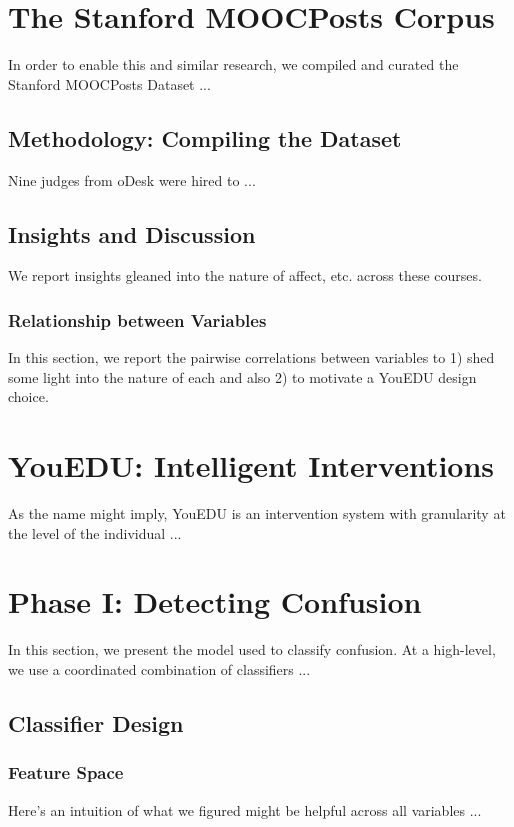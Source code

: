 \documentclass{edm_template}
\begin{document}
\section{The Stanford MOOCPosts Corpus}
In order to enable this and similar research, we compiled and curated the Stanford MOOCPosts Dataset ...

\subsection{Methodology: Compiling the Dataset}
Nine judges from oDesk were hired to ...

\subsection{Insights and Discussion}
We report insights gleaned into the nature of affect, etc. across these courses.

\subsubsection{Relationship between Variables}
In this section, we report the pairwise correlations between variables to 1) shed some light into the nature of each and also 2) to motivate a YouEDU design choice.

\section{YouEDU: Intelligent Interventions}
As the name might imply, YouEDU is an intervention system with granularity at the level of the individual ...

\section{Phase I: Detecting Confusion}
In this section, we present the model used to classify confusion. At a high-level, we use a coordinated combination of classifiers ...

\subsection{Classifier Design}
\subsubsection{Feature Space}
Here's an intuition of what we figured might be helpful across all variables ...
\end{document}
